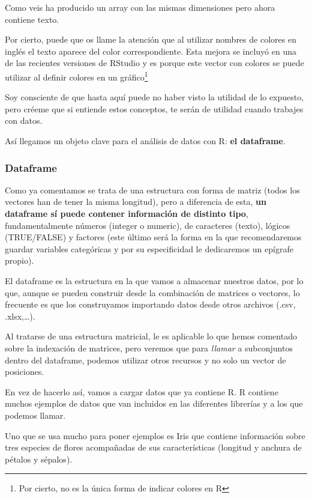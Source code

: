 \documentclass[
  letterpaper,
  DIV=11,
  numbers=noendperiod]{scrreprt}
\begin{document}
Como veis ha producido un array con las mismas dimensiones pero ahora
contiene texto.

Por cierto, puede que os llame la atención que al utilizar nombres de
colores en inglés el texto aparece del color correspondiente. Esta
mejora se incluyó en una de las recientes versiones de RStudio y es
porque este vector con colores se puede utilizar al definir colores en
un gráfico\footnote{Por cierto, no es la única forma de indicar colores
  en R}

Soy consciente de que hasta aquí puede no haber visto la utilidad de lo
expuesto, pero créeme que si entiende estos conceptos, te serán de
utilidad cuando trabajes con datos.

Así llegamos un objeto clave para el análisis de datos con R: \textbf{el
dataframe}.

\hypertarget{dataframe}{%
\subsubsection{Dataframe}\label{dataframe}}

Como ya comentamos se trata de una estructura con forma de matriz (todos
los vectores han de tener la misma longitud), pero a diferencia de esta,
\textbf{un dataframe sí puede contener información de distinto tipo},
fundamentalmente números (integer o numeric), de caracteres (texto),
lógicos (TRUE/FALSE) y factores (este último será la forma en la que
recomendaremos guardar variables categóricas y por su especificidad le
dedicaremos un epígrafe propio).

El dataframe es la estructura en la que vamos a almacenar nuestros
datos, por lo que, aunque se pueden construir desde la combinación de
matrices o vectores, lo frecuente es que los construyamos importando
datos desde otros archivos (.csv, .xlsx,\ldots).

Al tratarse de una estructura matricial, le es aplicable lo que hemos
comentado sobre la indexación de matrices, pero veremos que para
\emph{llamar} a subconjuntos dentro del dataframe, podemos utilizar
otros recursos y no solo un vector de posiciones.

En vez de hacerlo así, vamos a cargar datos que ya contiene R. R
contiene muchos ejemplos de datos que van incluidos en las diferentes
librerías y a los que podemos llamar.

Uno que se usa mucho para poner ejemplos es Iris que contiene
información sobre tres especies de flores acompañadas de sus
características (longitud y anchura de pétalos y sépalos).
\end{document}

